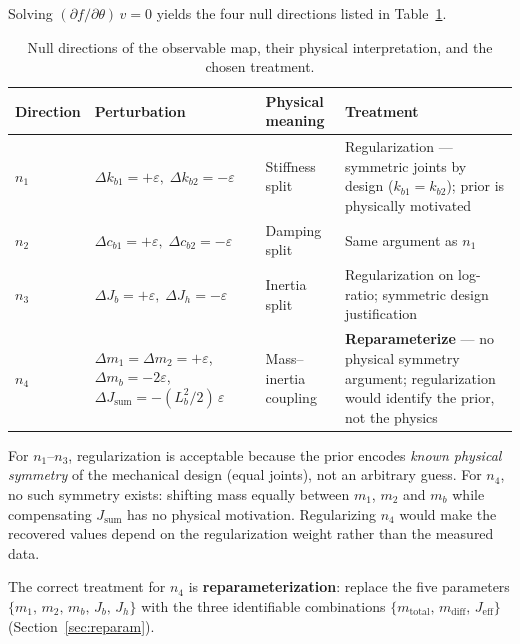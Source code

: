 \documentclass[11pt,a4paper]{article}
\begin{document}
Solving $(\partial f/\partial\theta)\,v = 0$ yields the four null directions
listed in Table~\ref{tab:null_directions}.

\begin{table}[h]
\centering
\caption{Null directions of the observable map, their physical
         interpretation, and the chosen treatment.}
\label{tab:null_directions}
\renewcommand{\arraystretch}{1.35}
\begin{tabular}{lp{5cm}p{2.5cm}p{4cm}}
\toprule
Direction & Perturbation & Physical meaning & Treatment \\
\midrule
$n_1$ &
  $\Delta k_{b1} = +\varepsilon,\; \Delta k_{b2} = -\varepsilon$ &
  Stiffness split &
  Regularization — symmetric joints by design ($k_{b1}=k_{b2}$); prior is
  physically motivated \\
$n_2$ &
  $\Delta c_{b1} = +\varepsilon,\; \Delta c_{b2} = -\varepsilon$ &
  Damping split &
  Same argument as $n_1$ \\
$n_3$ &
  $\Delta J_b = +\varepsilon,\; \Delta J_h = -\varepsilon$ &
  Inertia split &
  Regularization on log-ratio; symmetric design justification \\
$n_4$ &
  $\Delta m_1 = \Delta m_2 = +\varepsilon$,\newline
  $\Delta m_b = -2\varepsilon$,\newline
  $\Delta J_\mathrm{sum} = -(L_b^2/2)\,\varepsilon$ &
  Mass--inertia coupling &
  \textbf{Reparameterize} — no physical symmetry argument; regularization
  would identify the prior, not the physics \\
\bottomrule
\end{tabular}
\end{table}

For $n_1$--$n_3$, regularization is acceptable because the prior encodes
\emph{known physical symmetry} of the mechanical design (equal joints),
not an arbitrary guess.
For $n_4$, no such symmetry exists: shifting mass equally between $m_1$,
$m_2$ and $m_b$ while compensating $J_\mathrm{sum}$ has no physical
motivation.
Regularizing $n_4$ would make the recovered values depend on the
regularization weight rather than the measured data.

The correct treatment for $n_4$ is \textbf{reparameterization}: replace
the five parameters $\{m_1,\,m_2,\,m_b,\,J_b,\,J_h\}$ with the three
identifiable combinations $\{m_\mathrm{total},\,m_\mathrm{diff},\,J_\mathrm{eff}\}$
(Section~\ref{sec:reparam}).

\end{document}
